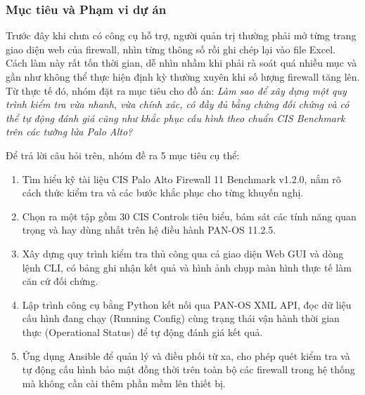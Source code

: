 \documentclass[12pt,a4paper]{article}
\begin{document}
\subsubsection{Mục tiêu và Phạm vi dự án}
\noindent Trước đây khi chưa có công cụ hỗ trợ, người quản trị thường phải mở từng trang giao diện web của firewall, nhìn từng thông số rồi ghi chép lại vào file Excel. Cách làm này rất tốn thời gian, dễ nhìn nhầm khi phải rà soát quá nhiều mục và gần như không thể thực hiện định kỳ thường xuyên khi số lượng firewall tăng lên. Từ thực tế đó, nhóm đặt ra mục tiêu cho đồ án: \emph{Làm sao để xây dựng một quy trình kiểm tra vừa nhanh, vừa chính xác, có đầy đủ bằng chứng đối chứng và có thể tự động đánh giá cũng như khắc phục cấu hình theo chuẩn CIS Benchmark trên các tường lửa Palo Alto?}

\vspace{0.3cm}

\noindent Để trả lời câu hỏi trên, nhóm đề ra 5 mục tiêu cụ thể:
\begin{enumerate}
    \item Tìm hiểu kỹ tài liệu CIS Palo Alto Firewall 11 Benchmark v1.2.0, nắm rõ cách thức kiểm tra và các bước khắc phục cho từng khuyến nghị.
    \item Chọn ra một tập gồm 30 CIS Controls tiêu biểu, bám sát các tính năng quan trọng và hay dùng nhất trên hệ điều hành PAN-OS 11.2.5.
    \item Xây dựng quy trình kiểm tra thủ công qua cả giao diện Web GUI và dòng lệnh CLI, có bảng ghi nhận kết quả và hình ảnh chụp màn hình thực tế làm căn cứ đối chứng.
    \item Lập trình công cụ bằng Python kết nối qua PAN-OS XML API, đọc dữ liệu cấu hình đang chạy (Running Config) cùng trạng thái vận hành thời gian thực (Operational Status) để tự động đánh giá kết quả.
    \item Ứng dụng Ansible để quản lý và điều phối từ xa, cho phép quét kiểm tra và tự động cấu hình bảo mật đồng thời trên toàn bộ các firewall trong hệ thống mà không cần cài thêm phần mềm lên thiết bị.
\end{enumerate}
\end{document}
